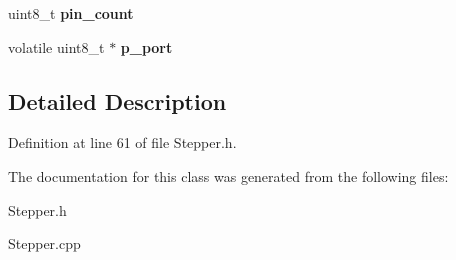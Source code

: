 \begin{DoxyCompactItemize}
\item 
\hypertarget{classStepper_ab769f992e1a9514fa2561967e3f8d22b}{uint8\-\_\-t {\bfseries pin\-\_\-count}}\label{classStepper_ab769f992e1a9514fa2561967e3f8d22b}

\item 
\hypertarget{classStepper_ae6dfea5c129586ec0690c6275b5cd8b6}{volatile uint8\-\_\-t $\ast$ {\bfseries p\-\_\-port}}\label{classStepper_ae6dfea5c129586ec0690c6275b5cd8b6}

\end{DoxyCompactItemize}


\subsection{\-Detailed \-Description}


\-Definition at line 61 of file \-Stepper.\-h.



\-The documentation for this class was generated from the following files\-:\begin{DoxyCompactItemize}
\item 
\-Stepper.\-h\item 
\-Stepper.\-cpp\end{DoxyCompactItemize}
